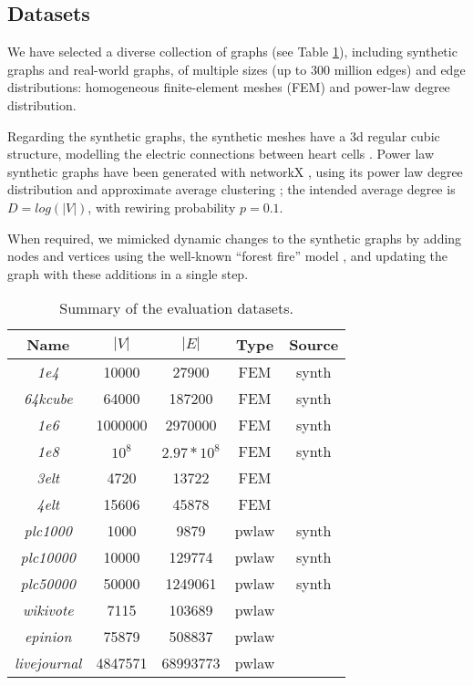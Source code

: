 \documentclass{sig-alternate-10pt}
\begin{document}
\subsection{Datasets}
\label{sec:dataset}

We have selected a diverse collection of graphs (see Table \ref{table:summary}), including synthetic graphs and real-world graphs, of multiple sizes (up to 300 million edges) and edge distributions: homogeneous finite-element meshes (FEM) and power-law degree distribution. 

Regarding the synthetic graphs, the synthetic meshes have a 3d regular cubic structure, modelling the electric connections between heart cells \cite{Tusscher2004}. Power law synthetic graphs have been generated with networkX \cite{networkx}, using its power law degree distribution and approximate average clustering \cite{powerlawgen}; the intended average degree is $ D = log(|V|) $, with rewiring 
probability $p =0.1$. 

When required, we mimicked dynamic changes to the synthetic graphs by adding nodes and vertices using the well-known ``forest fire'' model \cite{Leskovec2007}, and updating the graph with these additions in a single step.

\begin{table}[h!b!p!]
\vspace{-10pt}
\caption{ Summary of the evaluation datasets.}
\scriptsize
\label{table:summary} 
\center
    \begin{tabular}{ | c | c | c | c | c |}
    \hline
    Name & $|V|$ & $|E|$ & Type & Source \\ \hline
      \textit{1e4} & 10000 & 27900 & FEM & synth \\ \hline
      \textit{64kcube} & 64000 & 187200 & FEM & synth \\ \hline
      \textit{1e6} & 1000000 & 2970000 & FEM & synth \\ \hline
      \textit{1e8} & $10^8$ & $2.97 *10^8$ & FEM & synth \\ \hline
      \textit{3elt} & 4720 & 13722 & FEM & \cite{femgraphs} \\ \hline
      \textit{4elt} & 15606 & 45878 & FEM & \cite{femgraphs} \\ \hline
      \textit{plc1000} & 1000 & 9879 & pwlaw & synth \\ \hline
      \textit{plc10000} & 10000 & 129774 & pwlaw & synth \\ \hline
      \textit{plc50000} & 50000 & 1249061 & pwlaw & synth \\ \hline
      \textit{wikivote} & 7115 &  103689 & pwlaw & \cite{wikivote} \\ \hline
      \textit{epinion} & 75879 & 508837 & pwlaw & \cite{epinions} \\ \hline
       \textit{livejournal} & 4847571 & 68993773 & pwlaw & \cite{lwa} \\ \hline       
    \end{tabular}
\end{table}
\end{document}
